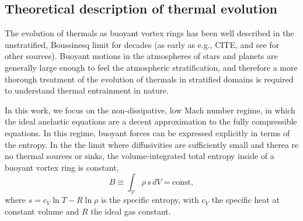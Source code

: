 \documentclass[twocolumn, amsmath, amsfonts, amssymb, trackchanges]{aastex62}
\begin{document}
\subsection{Theoretical description of thermal evolution}
The evolution of thermals as buoyant vortex rings has been well described in
the unstratified, Boussinesq limit for decades (as early as e.g., CITE, and
see \citet{lecoanet&jeevanjee2018} for other sources). Buoyant motions 
in the atmospheres of stars and planets are generally large enough to feel the
atmospheric stratification, and therefore a more thorough treatment of the
evolution of thermals in stratified domains is required to understand 
thermal entrainment in nature.

In this work, we focus on the non-dissipative, low Mach number regime, 
in which the ideal anelastic equations are a decent approximation to the fully
compressible equations. In this regime, buoyant forces can be expressed explicitly
in terms of the entropy. In the the limit where diffusivities
are sufficiently small and therea re no thermal sources or sinks, 
the volume-integrated total entropy inside of a buoyant vortex ring is constant,
\begin{equation}
B \equiv \int_{\mathcal{V}} \rho\, s\, dV = \text{const},
\end{equation}
where $s = c_V \ln T - R \ln\rho$ is the specific entropy, with $c_V$ the
specific heat at constant volume and $R$ the ideal gas constant.
\end{document}
